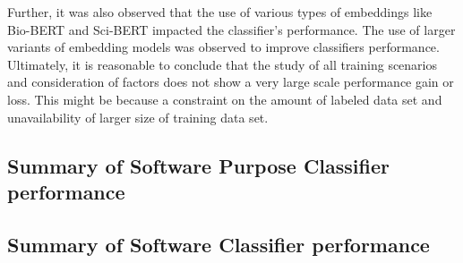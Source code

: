 Further, it was also observed that the use of various types of embeddings like Bio-BERT and Sci-BERT impacted the classifier’s performance. The use of larger variants of embedding models was observed to improve classifiers performance. \\

Ultimately, it is reasonable to conclude that the study of all training scenarios and consideration of factors does not show a very large scale performance gain or loss. This might be because a constraint on the amount of labeled data set and unavailability of larger size of training data set. 



\subsection{Summary of Software Purpose Classifier performance}
\label{sec:chapter06:summary_softPurpose}

\subsection{Summary of Software Classifier performance}
\label{sec:chapter06:summary_soft}



















